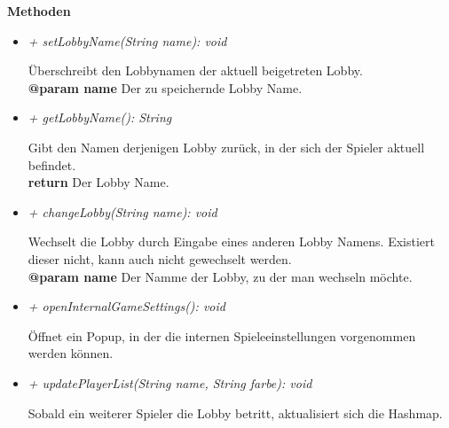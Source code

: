             \textbf{Methoden}					
            \begin{itemize}
                \item  \textit{+ setLobbyName(String name): void} 
                    \begin{leftbar}[0.9\linewidth]
                        Überschreibt den Lobbynamen der aktuell 
                        beigetreten Lobby.\\
                        \textbf{@param name} Der zu speichernde Lobby Name.\\
                    \end{leftbar}
                \item  \textit{+ getLobbyName(): String} 
                    \begin{leftbar}[0.9\linewidth]
                        Gibt den Namen derjenigen Lobby zurück, in der 
                        sich der Spieler aktuell befindet.\\
                        \textbf{return} Der Lobby Name.\\
                    \end{leftbar}
                \item  \textit{+ changeLobby(String name): void} 
                    \begin{leftbar}[0.9\linewidth]
                        Wechselt die Lobby durch Eingabe eines anderen 
                        Lobby Namens. Existiert dieser nicht, kann 
                        auch nicht gewechselt werden.\\
                        \textbf{@param name} Der Namme der Lobby, zu der 
                        man wechseln möchte.\\
                    \end{leftbar}
                \item  \textit{+ openInternalGameSettings(): void} 
                    \begin{leftbar}[0.9\linewidth]
                        Öffnet ein Popup, in der die internen Spieleeinstellungen 
                        vorgenommen werden können.
                    \end{leftbar}
                \item  \textit{+ updatePlayerList(String name, String farbe): void} 
                    \begin{leftbar}[0.9\linewidth]
                        Sobald ein weiterer Spieler die Lobby betritt, 
                        aktualisiert sich die Hashmap.\\

\end{leftbar}
\end{itemize}
